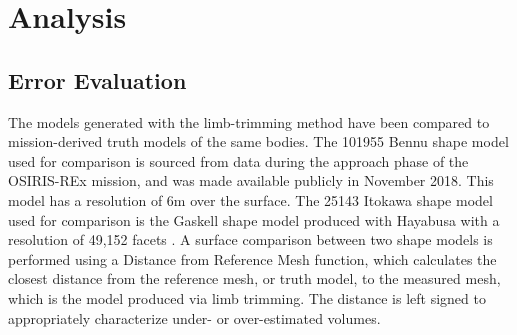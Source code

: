 \section{Analysis}
\subsection{Error Evaluation}
The models generated with the limb-trimming method have been compared to mission-derived truth models of the same bodies. The 101955 Bennu shape model used for comparison is sourced from data during the approach phase of the OSIRIS-REx mission, and was made available publicly in November 2018{}. This model has a resolution of 6m over the surface. The 25143 Itokawa shape model used for comparison is the Gaskell shape model produced with Hayabusa with a resolution of 49,152 facets \citep{Gaskell2004}. A surface comparison between two shape models is performed using a Distance from Reference Mesh function, which calculates the closest distance from the reference mesh, or truth model, to the measured mesh, which is the model produced via limb trimming. The distance is left signed to appropriately characterize under- or over-estimated volumes. 


          
          
          
